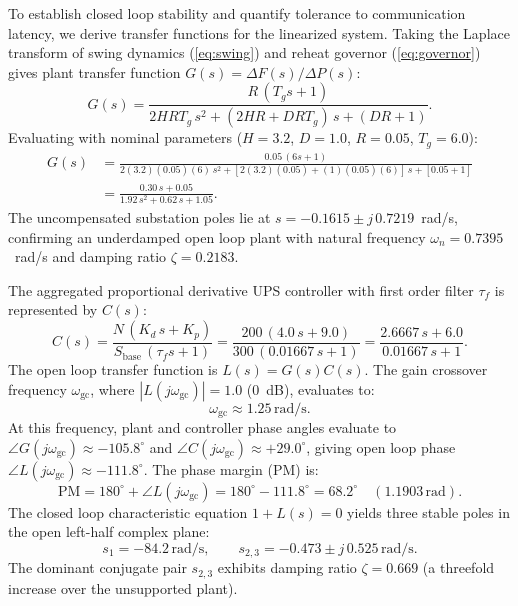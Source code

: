 \documentclass[preprint,12pt]{elsarticle}
\begin{document}
To establish closed loop stability and quantify tolerance to communication latency, we derive transfer functions for the linearized system. Taking the Laplace transform of swing dynamics (\ref{eq:swing}) and reheat governor (\ref{eq:governor}) gives plant transfer function $G(s) = \Delta F(s) / \Delta P(s)$:
\begin{equation}
G(s) = \frac{R\,(T_g s + 1)}{2H R T_g\,s^2 + (2H R + D R T_g)\,s + (D R + 1)}.
\label{eq:plant_tf}
\end{equation}
Evaluating with nominal parameters ($H=3.2$, $D=1.0$, $R=0.05$, $T_g=6.0$):
\begin{align}
G(s) &= \frac{0.05\,(6s + 1)}{2(3.2)(0.05)(6)\,s^2 + [2(3.2)(0.05) + (1)(0.05)(6)]\,s + [0.05 + 1]} \nonumber \\
&= \frac{0.30\,s + 0.05}{1.92\,s^2 + 0.62\,s + 1.05}.
\label{eq:plant_tf_num}
\end{align}
The uncompensated substation poles lie at $s = -0.1615 \pm j\,0.7219$~rad/s, confirming an underdamped open loop plant with natural frequency $\omega_n = 0.7395$~rad/s and damping ratio $\zeta = 0.2183$.

The aggregated proportional derivative UPS controller with first order filter $\tau_f$ is represented by $C(s)$:
\begin{equation}
C(s) = \frac{N\,(K_d\,s + K_p)}{S_{\mathrm{base}}\,(\tau_f s + 1)} = \frac{200\,(4.0\,s + 9.0)}{300\,(0.01667\,s + 1)} = \frac{2.6667\,s + 6.0}{0.01667\,s + 1}.
\label{eq:controller_tf}
\end{equation}
The open loop transfer function is $L(s) = G(s) C(s)$. The gain crossover frequency $\omega_{\mathrm{gc}}$, where $|L(j\omega_{\mathrm{gc}})| = 1.0$ ($0$~dB), evaluates to:
\begin{equation}
\omega_{\mathrm{gc}} \approx 1.25\,\mathrm{rad/s}.
\label{eq:crossover}
\end{equation}
At this frequency, plant and controller phase angles evaluate to $\angle G(j\omega_{\mathrm{gc}}) \approx -105.8^\circ$ and $\angle C(j\omega_{\mathrm{gc}}) \approx +29.0^\circ$, giving open loop phase $\angle L(j\omega_{\mathrm{gc}}) \approx -111.8^\circ$. The phase margin ($\mathrm{PM}$) is:
\begin{equation}
\mathrm{PM} = 180^\circ + \angle L(j\omega_{\mathrm{gc}}) = 180^\circ - 111.8^\circ = 68.2^\circ \quad (1.1903\,\mathrm{rad}).
\label{eq:phase_margin}
\end{equation}
The closed loop characteristic equation $1 + L(s) = 0$ yields three stable poles in the open left-half complex plane:
\begin{equation}
s_1 = -84.2\,\mathrm{rad/s}, \qquad s_{2,3} = -0.473 \pm j\,0.525\,\mathrm{rad/s}.
\label{eq:closed_loop_poles}
\end{equation}
The dominant conjugate pair $s_{2,3}$ exhibits damping ratio $\zeta = 0.669$ (a threefold increase over the unsupported plant).
\end{document}

